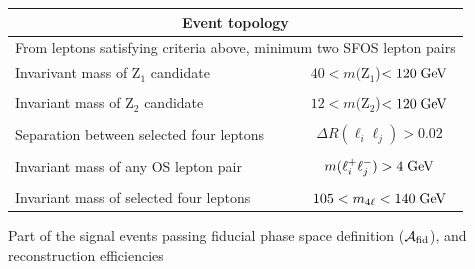 \begin{table}[!h!tb]
\begin{center}
\begin{tabular}{|lc|}
\multicolumn{2}{|c|}{Event topology} \\
\hline %
\multicolumn{2}{|l|}{From leptons satisfying criteria above, minimum two SFOS lepton pairs} \\
Invarivant mass of Z$_1$ candidate & $40 < m($Z$_{1}$)$< 120 \hbox{$\;\hbox{\rm GeV}$}$ \\
\vspace{-0.4cm} & \\
Invariant mass of Z$_2$ candidate & $12 < m($Z$_{2}$)$< 120 \hbox{$\;\hbox{\rm GeV}$}$ \\
\vspace{-0.4cm} & \\
Separation between selected four leptons & $\Delta R(\ell_{i}\ell_{j})>0.02$  \\
\vspace{-0.4cm} & \\
Invariant mass of any OS lepton pair & $m(\ell^{+}_{i}\ell^{-}_{j})>4 \hbox{$\;\hbox{\rm GeV}$}$ \\
\vspace{-0.4cm} & \\
Invariant mass of selected four leptons & $105 < m_{4\ell} < 140 \hbox{$\;\hbox{\rm GeV}$}$  \\
\hline %
\hline %
\end{tabular}
\normalsize
\end{center}
\end{table}
\par 
Part of the signal events passing fiducial phase space definition ($\mathcal{A}_{\rm fid}$), and reconstruction efficiencies
